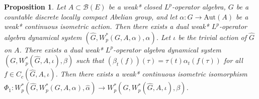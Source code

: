 \documentclass[reqno,11pt]{amsart}
\theoremstyle{plain}
\newtheorem{prop}[thm]{Proposition}
\theoremstyle{definition}
\theoremstyle{remark}
\begin{document}
\begin{prop}\label{1}
Let $A\subset \mathcal{B}(E)$ be a weak* closed $L^p$-operator algebra, $G$ be a countable discrete locally compact Abelian group, and let $\alpha:G\rightarrow \mathrm{Aut}(A)$ be a weak* continuous isometric action. Then there exists a dual weak* $L^p$-operator algebra dynamical system $(\hat{G},W^*_p(G,A,\alpha),\hat{\alpha})$. Let $\iota$ be the trivial action of $\hat{G}$ on $A$. There exists a dual weak* $L^p$-operator algebra dynamical system $(G,W^*_p(\hat{G},A,\iota),\beta)$ such that $\left(\beta_t(f)\right)(\tau)=\tau(t)\alpha_t\left(f(\tau)\right)$ for all $f\in C_c(\hat{G},A,\iota)$.
Then there exists a weak* continuous isometric isomorphism $\Phi_1: W^*_p(\hat{G},W^*_p(G,A,\alpha),\hat{\alpha})\rightarrow W^*_p(G,W^*_p(\hat{G},A,\iota),\beta)$.
\end{prop}
\end{document}
